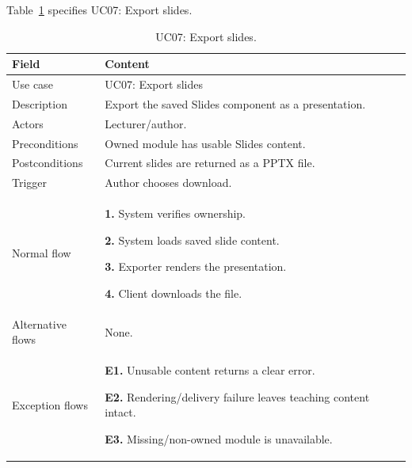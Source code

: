 \needspace{.39\textheight}
Table~\ref{tab:uc-07} specifies UC07: Export slides.
\begin{table}[H]\centering\footnotesize{}\renewcommand{\arraystretch}{1.05}
\caption{UC07: Export slides.}\label{tab:uc-07}
\begin{tabular}{|p{2.8cm}|p{11.9cm}|}\hline
\textbf{Field} & \textbf{Content}\\\hline
Use case & UC07: Export slides\\\hline
Description & Export the saved Slides component as a presentation.\\\hline
Actors & Lecturer/author.\\\hline
Preconditions & Owned module has usable Slides content.\\\hline
Postconditions & Current slides are returned as a PPTX file.\\\hline
Trigger & Author chooses download.\\\hline
Normal flow & \textbf{1.} System verifies ownership.\par \textbf{2.} System loads saved slide content.\par \textbf{3.} Exporter renders the presentation.\par \textbf{4.} Client downloads the file.\\\hline
Alternative flows & None.\\\hline
Exception flows & \textbf{E1.} Unusable content returns a clear error.\par \textbf{E2.} Rendering/delivery failure leaves teaching content intact.\par \textbf{E3.} Missing/non-owned module is unavailable.\\\hline
\end{tabular}\end{table}

